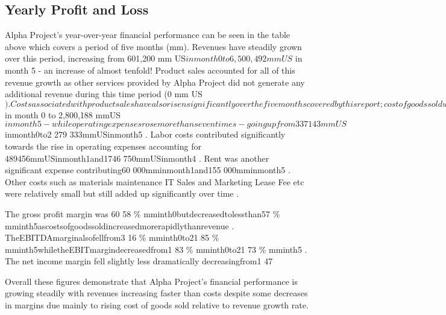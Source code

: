 

\subsection{Yearly Profit and Loss}\label{sec:title}

Alpha Project's year-over-year financial performance can be seen in the table above which covers a period of five months (mm). Revenues have steadily grown over this period, increasing from 601,200 mm US$ in month 0 to 6,500,492 mm US$ in month 5 - an increase of almost tenfold!  Product sales accounted for all of this revenue growth as other services provided by Alpha Project did not generate any additional revenue during this time period (0 mm US$). 

Costs associated with product sales have also risen significantly over the five months covered by this report; cost of goods sold went up by 11 times - increasing from 237,000 mm US$ in month 0 to 2,800,188 mmUS$ in month 5 - while operating expenses rose more than seven times - going up from 337143mmUS$inmonth0to2 279 333mmUSinmonth5 . Labor costs contributed significantly towards the rise in operating expenses accounting for 489456mmUSinmonth1and1746 750mmUSinmonth4 . Rent was another significant expense contributing60 000mminmonth1and155 000mminmonth5 . Other costs such as materials maintenance IT Sales and Marketing Lease Fee etc were relatively small but still added up significantly over time . 

The gross profit margin was 60 58 \% mminth0butdecreasedtolessthan57 \% mminth5ascostsofgoodssoldincreasedmorerapidlythanrevenue . TheEBITDAmarginalsofellfrom3 16 \% mminth0to21 85 \% mminth5whiletheEBITmargindecreasedfrom1 83 \% mminth0to21 73 \% mminth5 . The net income margin fell slightly less dramatically decreasingfrom1 47 \ %

Overall these figures demonstrate that Alpha Project's financial performance is growing steadily with revenues increasing faster than costs despite some decreases in margins due mainly to rising cost of goods sold relative to revenue growth rate.